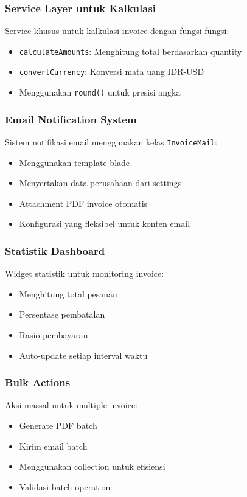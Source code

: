 \documentclass[a4paper]{report}
\begin{document}
\subsubsection{Service Layer untuk Kalkulasi}
Service khusus untuk kalkulasi invoice dengan fungsi-fungsi:
\begin{itemize}
\item \texttt{calculateAmounts}: Menghitung total berdasarkan quantity
\item \texttt{convertCurrency}: Konversi mata uang IDR-USD
\item Menggunakan \texttt{round()} untuk presisi angka
\end{itemize}

\subsubsection{Email Notification System}
Sistem notifikasi email menggunakan kelas \texttt{InvoiceMail}:
\begin{itemize}
\item Menggunakan template blade
\item Menyertakan data perusahaan dari settings
\item Attachment PDF invoice otomatis
\item Konfigurasi yang fleksibel untuk konten email
\end{itemize}

\subsubsection{Statistik Dashboard}
Widget statistik untuk monitoring invoice:
\begin{itemize}
\item Menghitung total pesanan
\item Persentase pembatalan
\item Rasio pembayaran
\item Auto-update setiap interval waktu
\end{itemize}

\subsubsection{Bulk Actions}
Aksi massal untuk multiple invoice:
\begin{itemize}
\item Generate PDF batch
\item Kirim email batch
\item Menggunakan collection untuk efisiensi
\item Validasi batch operation
\end{itemize}
\end{document}
